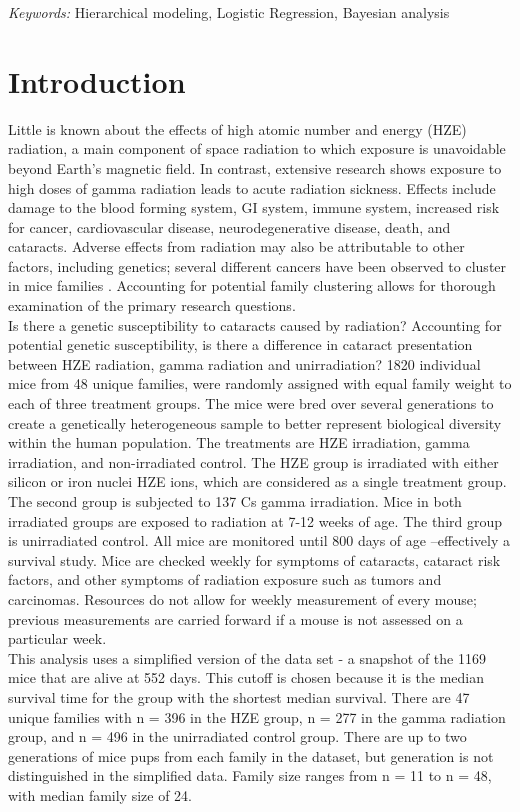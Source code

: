 \documentclass[12pt]{article}
\begin{document}
\noindent%
{\it Keywords:} Hierarchical modeling, Logistic Regression, Bayesian analysis
\vfill

\newpage
{} %

\section{Introduction}
\label{sec:intro}

Little is known about the effects of high atomic number and energy (HZE) radiation, a main component of space radiation to which exposure is unavoidable beyond Earth's magnetic field. In contrast, extensive research shows exposure to high doses of gamma radiation leads to acute radiation sickness. Effects include damage to the blood forming system, GI system, immune system, increased risk for cancer, cardiovascular disease, neurodegenerative disease, death, and cataracts. Adverse effects from radiation may also be attributable to other factors, including genetics; several different cancers have been observed to cluster in mice families \citep{mice2017}. Accounting for potential family clustering allows for thorough examination of the primary research questions.\\
Is there a genetic susceptibility to cataracts caused by radiation? Accounting for potential genetic susceptibility, is there a difference in cataract presentation between HZE radiation, gamma radiation and unirradiation? 1820 individual mice from 48 unique families, were randomly assigned with equal family weight to each of three treatment groups. The mice were bred over several generations to create a genetically heterogeneous sample to better represent biological diversity within the human population. The treatments are HZE irradiation, gamma irradiation, and non-irradiated control. The HZE group is irradiated with either silicon or iron nuclei HZE ions, which are considered as a single treatment group. The second group is subjected to 137 Cs gamma irradiation. Mice in both irradiated groups are exposed to radiation at 7-12 weeks of age. The third group is unirradiated control. All mice are monitored until 800 days of age --effectively a survival study. Mice are checked weekly for symptoms of cataracts, cataract risk factors, and other symptoms of radiation exposure such as tumors and carcinomas. Resources do not allow for weekly measurement of every mouse; previous measurements are carried forward if a mouse is not assessed on a particular week.\\
This analysis uses a simplified version of the data set - a snapshot of the 1169 mice that are alive at 552 days. This cutoff is chosen because it is the median survival time for the group with the shortest median survival. There are 47 unique families with n = 396 in the HZE group, n = 277 in the gamma radiation group, and n = 496 in the unirradiated control group. There are up to two generations of mice pups from each family in the dataset, but generation is not distinguished in the simplified data. Family size ranges from n = 11 to n = 48, with median family size of 24.
\end{document}
